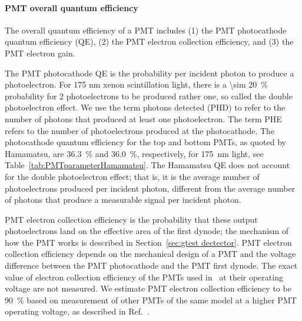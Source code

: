 \paragraph{PMT overall quantum efficiency} 
The overall quantum efficiency of a PMT includes (1) the PMT photocathode quantum efficiency (QE), (2) the PMT electron collection efficiency, and (3) the PMT electron gain.

The PMT photocathode QE is the probability per incident photon to produce a photoelectron. For 175 nm xenon scintillation light, there is a \SI{\sim 20}{\percent} probability for 2 photoelectrons to be produced rather one, so called the double photoelectron effect. We use the term photons detected (PHD) to refer to the number of photons that produced at least one photoelectron. The term PHE refers to the number of photoelectrons produced at the photocathode. The photocathode quantum efficiency for the top and bottom PMTs, as quoted by Hamamatsu, are \SI{36.3}{\percent} and \SI{36.0}{\percent}, respectively, for \SI{175}{\nm} light, see Table~\ref{tab:PMTparameterHamamatsu}. The Hamamatsu QE does not account for the double photoelectron effect; that is, it is the average number of photoelectrons produced per incident photon, different from the average number of photons that produce a measurable signal per incident photon.



PMT electron collection efficiency is the probability that these output photoelectrons land on the effective area of the first dynode; the mechanism of how the PMT works is described in Section~\ref{sec:gtest dectector}. %
PMT electron collection efficiency depends on the mechanical design of a PMT and the voltage difference between the PMT photocathode and the PMT first dynode. The exact value of electron collection efficiency of the PMTs used in \gtest\ at their operating voltage are not measured. We estimate PMT electron collection efficiency to be \SI{90}{\percent} based on measurement of other PMTs of the same model at a higher PMT operating voltage, as described in Ref.~\cite{Lung2012
}.


